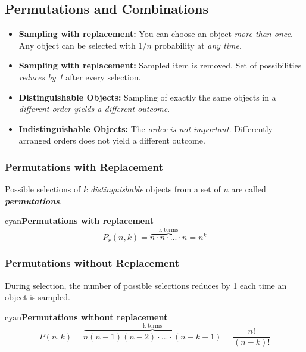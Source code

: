 \documentclass{article}
\newenvironment{formula}[1]{\begin{mybox}{cyan}{\textbf{#1}}}{\end{mybox}}
\begin{document}
\subsection{Permutations and Combinations}

\begin{itemize}
    \item \textbf{Sampling with replacement:} You can choose an object \textit{more than once}. Any object can be selected with $1/n$ probability at \textit{any time}.
    \item \textbf{Sampling with replacement:} Sampled item is removed. Set of possibilities \textit{reduces by 1} after every selection.
    \item \textbf{Distinguishable Objects:} Sampling of exactly the same objects in a \textit{different order yields a different outcome}.
    \item \textbf{Indistinguishable Objects:} The \textit{order is not important}. Differently arranged orders does not yield a different outcome.
\end{itemize}

\subsubsection{Permutations with Replacement}

Possible selections of $k$ \textit{distinguishable} objects from a set of $n$ are called \textbf{\textit{permutations}}.
\begin{formula}{Permutations with replacement}
\begin{equation*}
    P_r(n,k) = \overbrace{n \cdot n \cdot ... \cdot n}^{\text{k terms}} = n^k
\end{equation*}
\end{formula}

\subsubsection{Permutations without Replacement}

During selection, the number of possible selections reduces by 1 each time an object is sampled.
\begin{formula}{Permutations without replacement}
\begin{equation*}
    P(n,k) = \overbrace{n(n-1)(n-2) \cdot ... \cdot (n - k + 1)}^{\text{k terms}} = \frac{n!}{(n - k)!}
\end{equation*}
\end{formula}
\end{document}
